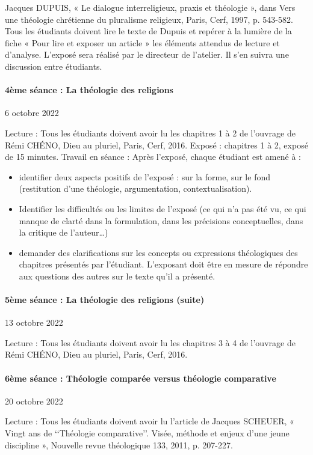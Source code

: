 Jacques DUPUIS, « Le dialogue interreligieux, praxis et théologie », dans Vers une théologie chrétienne du pluralisme religieux, Paris, Cerf, 1997, p. 543-582.
Tous les étudiants doivent lire le texte de Dupuis et repérer à la lumière de la fiche « Pour lire et exposer un article » les éléments attendus de lecture et d’analyse. 
L’exposé sera réalisé par le directeur de l’atelier. 
Il s’en suivra une discussion entre étudiants. 
\paragraph{4ème séance : La théologie des religions }   6 octobre 2022


Lecture : Tous les étudiants doivent avoir lu les chapitres 1 à 2 de l’ouvrage de Rémi CHÉNO, Dieu au pluriel, Paris, Cerf, 2016. 
Exposé : chapitres 1 à 2,  exposé de 15 minutes. 
Travail en séance : Après l’exposé, chaque étudiant est amené à : 
\begin{itemize}
    \item 	identifier deux aspects positifs de l’exposé : sur la forme, sur le fond (restitution d’une théologie, argumentation, contextualisation). 
\item	Identifier les difficultés ou les limites de l’exposé (ce qui n’a pas été vu, ce qui manque de clarté dans la formulation, dans les précisions conceptuelles, dans la critique de l’auteur…)
\item	demander des clarifications sur les concepts ou expressions théologiques des chapitres présentés par l’étudiant. L’exposant doit être en mesure de répondre aux questions des autres sur le texte qu’il a présenté. 
\end{itemize}


\paragraph{5ème séance : La théologie des religions (suite) }   13 octobre 2022


Lecture : Tous les étudiants doivent avoir lu les chapitres 3 à 4 de l’ouvrage de Rémi CHÉNO, Dieu au pluriel, Paris, Cerf, 2016. 


\paragraph{6ème séance : Théologie comparée versus théologie comparative}    20 octobre 2022 


Lecture : Tous les étudiants doivent avoir lu l’article de Jacques SCHEUER, « Vingt ans de ‘‘Théologie comparative’’. Visée, méthode et enjeux d’une jeune discipline », Nouvelle revue théologique 133, 2011, p. 207-227.

